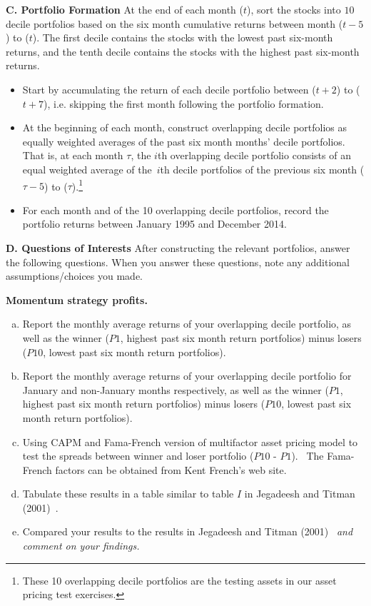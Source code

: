 \textbf{C. Portfolio Formation}
At the end of each month ($t$), sort the stocks into $10$ decile portfolios based on the six month cumulative returns between month ($t-5$) to ($t$). The first decile contains the stocks with the lowest past six-month returns, and the tenth decile contains the stocks with the highest past six-month returns.
	\begin{itemize}
	\item Start by accumulating the return of each decile portfolio between ($t+2$) to ($t+7$), i.e. skipping the first month following the portfolio
formation.
	\item At the beginning of each month, construct overlapping decile portfolios as equally weighted averages of the past six month months' decile portfolios. That is, at each month $\tau $, the $i$th overlapping decile portfolio consists of an equal weighted average of the\ $i$th decile portfolios of the previous six month ($\tau -5$) to ($\tau $).\footnote{These 10 overlapping decile portfolios are the testing assets in our asset
pricing test exercises.}
	\item For each month and of the 10 overlapping decile portfolios, record the portfolio returns between January 1995 and December 2014. \twomedskip
	\end{itemize}

\textbf{D. Questions of Interests}
After constructing the relevant portfolios, answer the following questions. When you answer these questions, note any additional assumptions/choices you made. \twomedskip


\textbf{Momentum strategy profits.}
	\begin{enumerate}[a.)]
	\item Report the monthly average returns of your overlapping decile portfolio, as well as the winner ($P1$, highest past six month return portfolios) minus losers ($P10$, lowest past six month return portfolios).
	\item Report the monthly average returns of your overlapping decile portfolio for January and non-January months respectively, as well as the winner ($P1$, highest past six month return portfolios) minus losers ($P10$, lowest past six month return portfolios).
	\item Using CAPM and Fama-French version of multifactor asset pricing model to test the spreads between winner and loser portfolio ($P10$ - $P1$). \ The Fama-French factors can be obtained from Kent French's web site.
	\item Tabulate these results in a table similar to table $I$ in Jegadeesh and Titman (2001)~\cite{JeTi}.
	\item Compared your results to the results in Jegadeesh and Titman (2001)~\cite{JeTi} \emph{and comment on your findings.} \twomedskip
	\end{enumerate}

